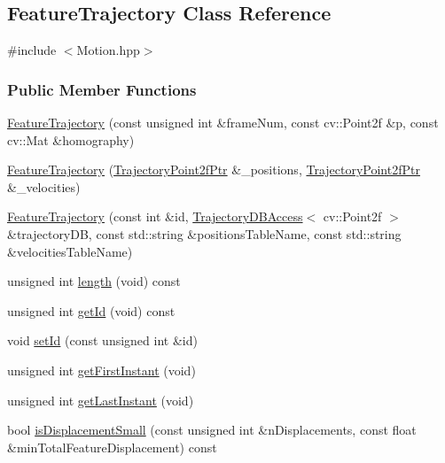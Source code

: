 \hypertarget{classFeatureTrajectory}{\subsection{Feature\-Trajectory Class Reference}
\label{classFeatureTrajectory}
}


{\ttfamily \#include $<$Motion.\-hpp$>$}

\subsubsection*{Public Member Functions}
\begin{DoxyCompactItemize}
\item 
\hyperlink{classFeatureTrajectory_a32e931d781e60a03604e2c65aaf56317}{Feature\-Trajectory} (const unsigned int \&frame\-Num, const cv\-::\-Point2f \&p, const cv\-::\-Mat \&homography)
\item 
\hyperlink{classFeatureTrajectory_a84e2b358ff865ab28f4d631052238ed9}{Feature\-Trajectory} (\hyperlink{Motion_8hpp_a8f08058062f917b510f6fb9de6d4b52b}{Trajectory\-Point2f\-Ptr} \&\-\_\-positions, \hyperlink{Motion_8hpp_a8f08058062f917b510f6fb9de6d4b52b}{Trajectory\-Point2f\-Ptr} \&\-\_\-velocities)
\item 
\hyperlink{classFeatureTrajectory_ad4ddc06cffd45066a679bedbe5e0ecfc}{Feature\-Trajectory} (const int \&id, \hyperlink{classTrajectoryDBAccess}{Trajectory\-D\-B\-Access}$<$ cv\-::\-Point2f $>$ \&trajectory\-D\-B, const std\-::string \&positions\-Table\-Name, const std\-::string \&velocities\-Table\-Name)
\item 
unsigned int \hyperlink{classFeatureTrajectory_a1ed414b6f14100c732f4566381e2029b}{length} (void) const 
\item 
unsigned int \hyperlink{classFeatureTrajectory_aa6481377d9f97cdd948f50ff810b32d6}{get\-Id} (void) const 
\item 
void \hyperlink{classFeatureTrajectory_ac40c45b8b079a30e1e601024fc26bbe4}{set\-Id} (const unsigned int \&id)
\item 
unsigned int \hyperlink{classFeatureTrajectory_a546be1e577bc4db6ea58c5c609bf7776}{get\-First\-Instant} (void)
\item 
unsigned int \hyperlink{classFeatureTrajectory_ab6978056c6ec378cd22b886f4473dfe6}{get\-Last\-Instant} (void)
\item 
bool \hyperlink{classFeatureTrajectory_a4a8c34605689481eccf34b3388a425f7}{is\-Displacement\-Small} (const unsigned int \&n\-Displacements, const float \&min\-Total\-Feature\-Displacement) const 

\end{DoxyCompactItemize}
